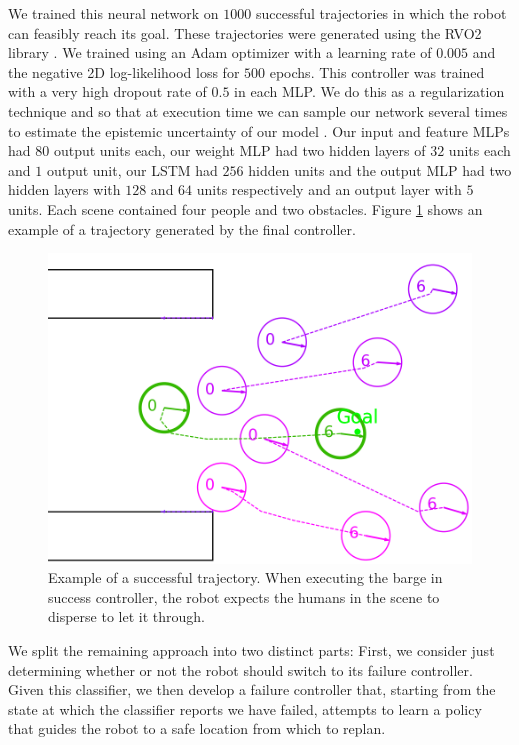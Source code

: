 \documentclass[letterpaper, 10 pt, conference]{ieeeconf}  %
\begin{document}
	We trained this neural network on $1000$ successful trajectories in which the robot can feasibly reach its goal. These trajectories were generated using the RVO2 library \cite{rvo2}\cite{pyrvo2}. We trained using an Adam optimizer with a learning rate of $0.005$ and the negative 2D log-likelihood loss for $500$ epochs. This controller was trained with a very high dropout rate of $0.5$ in each MLP. We do this as a regularization technique and so that at execution time we can sample our network several times to estimate the epistemic uncertainty of our model \cite{gal2016uncertainty}. Our input and feature MLPs had $80$ output units each, our weight MLP had two hidden layers of $32$ units each and $1$ output unit, our LSTM had $256$ hidden units and the output MLP had two hidden layers with $128$ and $64$ units respectively and an output layer with $5$ units. Each scene contained four people and two obstacles. Figure \ref{fig:success} shows an example of a trajectory generated by the final controller. 

	\begin{figure}
		\centering
		\includegraphics[width=\linewidth]{success_without_ellipses}
		\caption{Example of a successful trajectory. When executing the barge in success controller, the robot expects the humans in the scene to disperse to let it through.}
		\label{fig:success}
	\end{figure}
	
	We split the remaining approach into two distinct parts: First, we consider just determining whether or not the robot should switch to its failure controller. Given this classifier, we then develop a failure controller that, starting from the state at which the classifier reports we have failed, attempts to learn a policy that guides the robot to a safe location from which to replan.
	
\end{document}
